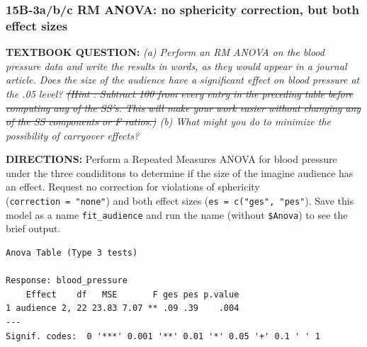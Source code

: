 \documentclass[]{article}
\newenvironment{Shaded}{\begin{snugshade}}{\end{snugshade}}
\newcommand{\KeywordTok}[1]{\textcolor[rgb]{0.13,0.29,0.53}{\textbf{#1}}}
\newcommand{\DataTypeTok}[1]{\textcolor[rgb]{0.13,0.29,0.53}{#1}}
\newcommand{\DecValTok}[1]{\textcolor[rgb]{0.00,0.00,0.81}{#1}}
\newcommand{\StringTok}[1]{\textcolor[rgb]{0.31,0.60,0.02}{#1}}
\newcommand{\CommentTok}[1]{\textcolor[rgb]{0.56,0.35,0.01}{\textit{#1}}}
\newcommand{\OperatorTok}[1]{\textcolor[rgb]{0.81,0.36,0.00}{\textbf{#1}}}
\newcommand{\NormalTok}[1]{#1}
\begin{document}
\clearpage

\subsubsection{15B-3a/b/c RM ANOVA: no sphericity correction, but both
effect
sizes}\label{b-3abc-rm-anova-no-sphericity-correction-but-both-effect-sizes}

\textbf{TEXTBOOK QUESTION:} \emph{(a) Perform an RM ANOVA on the blood
pressure data and write the results in words, as they would appear in a
journal article. Does the size of the audience have a significant effect
on blood pressure at the .05 level? \sout{(Hint : Subtract 100 from
every entry in the preceding table before computing any of the SS's.
This will make your work easier without changing any of the SS
components or F ratios.)} (b) What might you do to minimize the
possibility of carryover effects?}

\textbf{DIRECTIONS:} Perform a Repeated Measures ANOVA for blood
pressure under the three condiditons to determine if the size of the
imagine audience has an effect. Request no correction for violations of
sphericity (\texttt{correction\ =\ "none"}) and both effect sizes
(\texttt{es\ =\ c("ges",\ "pes"}). Save this model as a name
\texttt{fit\_audience} and run the name (without \texttt{\$Anova}) to
see the brief output.

\begin{Shaded}
\end{Shaded}

\begin{verbatim}
Anova Table (Type 3 tests)

Response: blood_pressure
    Effect    df   MSE       F ges pes p.value
1 audience 2, 22 23.83 7.07 ** .09 .39    .004
---
Signif. codes:  0 '***' 0.001 '**' 0.01 '*' 0.05 '+' 0.1 ' ' 1
\end{verbatim}
\end{document}
